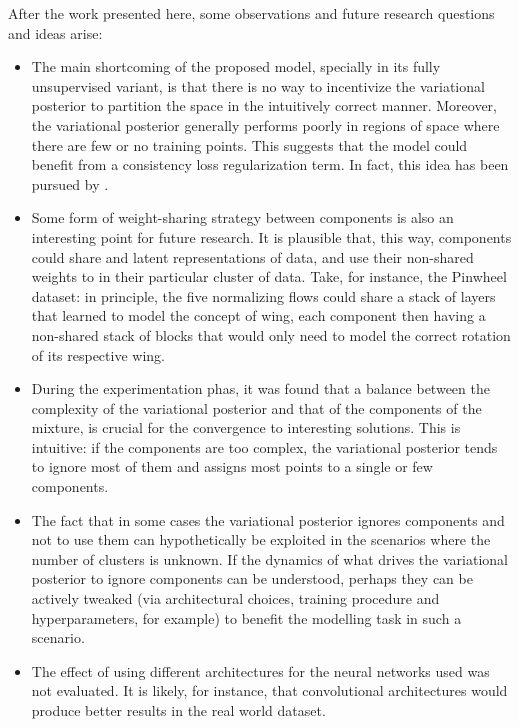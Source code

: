 After the work presented here, some observations and future research questions
and ideas arise:
\begin{itemize}
    \item The main shortcoming of the proposed model, specially in its fully
    unsupervised variant, is that there is no way to incentivize the variational
    posterior to partition the space in the intuitively correct manner. Moreover, the
    variational posterior generally performs poorly in regions of space where there are few
    or no training points. This suggests that the model could benefit from a consistency
    loss regularization term. In fact, this idea has been pursued by \textcite{semisuplearning_nflows}.
    \item Some form of weight-sharing strategy between components is also an interesting
    point for future research. It is plausible that, this way, components could
    share  and latent representations of data, and use their non-shared
    weights to  in their particular cluster of data. Take,
    for instance, the Pinwheel dataset: in principle, the five normalizing flows
    could share a stack of layers that learned to model the concept of wing,
    each component then having a non-shared stack of blocks that would only
    need to model the correct rotation of its respective wing.
    \item During the experimentation phas, it was found that a balance between
    the complexity of the variational posterior and that of the components of
    the mixture, is crucial for the convergence to interesting solutions. This
    is intuitive: if the components are too complex, the variational posterior
    tends to ignore most of them and assigns most points to a single or few components.
    \item The fact that in some cases the variational posterior ignores components
    and  not to use them can hypothetically be exploited in the scenarios
    where the number of clusters is unknown. If the dynamics of what drives the
    variational posterior to ignore components can be understood, perhaps they
    can be actively tweaked (via architectural choices, training procedure and
    hyperparameters, for example) to benefit the modelling task in such a scenario.
    \item The effect of using different architectures for the neural networks used
    was not evaluated. It is likely, for instance, that convolutional architectures
    would produce better results in the real world dataset.
\end{itemize}

